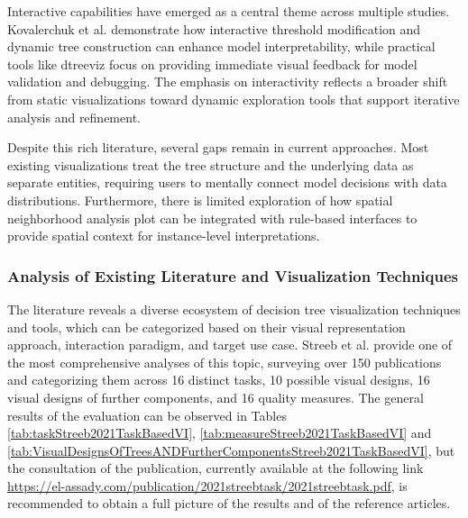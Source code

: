 Interactive capabilities have emerged as a central theme across multiple studies. Kovalerchuk et al. \cite{kovalerchuk2019interactive} demonstrate how interactive threshold modification and dynamic tree construction can enhance model interpretability, while practical tools like dtreeviz \cite{parr2019dtreeviz} focus on providing immediate visual feedback for model validation and debugging. The emphasis on interactivity reflects a broader shift from static visualizations toward dynamic exploration tools that support iterative analysis and refinement.

Despite this rich literature, several gaps remain in current approaches. Most existing visualizations treat the tree structure and the underlying data as separate entities, requiring users to mentally connect model decisions with data distributions. Furthermore, there is limited exploration of how spatial neighborhood analysis plot can be integrated with rule-based interfaces to provide spatial context for
instance-level interpretations. 

\subsubsection{Analysis of Existing Literature and Visualization Techniques}

The literature reveals a diverse ecosystem of decision tree visualization techniques and tools, which can be categorized based on their visual representation approach, interaction paradigm, and target use case. Streeb et al. \cite{Streeb2021TaskBasedVI} provide one of the most comprehensive analyses of this topic, surveying over 150 publications and categorizing them across 16 distinct tasks, 10 possible visual designs, 16 visual designs of further components, and 16 quality measures.
The general results of the evaluation can be observed in Tables \ref{tab:taskStreeb2021TaskBasedVI}, \ref{tab:measureStreeb2021TaskBasedVI} and \ref{tab:VisualDesignsOfTreesANDFurtherComponentsStreeb2021TaskBasedVI}, but the consultation of the publication, currently available at the following link \href{https://el-assady.com/publication/2021streebtask/2021streebtask.pdf}{https://el-assady.com/publication/2021streebtask/2021streebtask.pdf}, is recommended to obtain a full picture of the results and of the reference articles.


